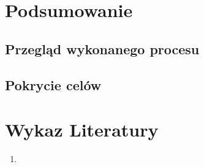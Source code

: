 \documentclass[12pt, a4paper]{report}
\begin{document}
\section{Podsumowanie}

\subsection{Przegląd wykonanego procesu}

\subsection{Pokrycie celów}


\newpage
{}
\section*{Wykaz Literatury}
\renewcommand{\labelenumi}{[\arabic{enumi}]}
\begin{enumerate}

\item





\end{enumerate}
\end{document}
